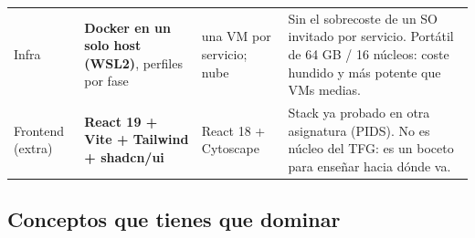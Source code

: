 \documentclass[11pt,a4paper]{article}
\begin{document}
\begin{center}
\begin{longtable}{>{\raggedright\arraybackslash}p{2.4cm} >{\raggedright\arraybackslash}p{3.1cm} >{\raggedright\arraybackslash}p{2.5cm} >{\raggedright\arraybackslash}p{6.2cm}}
Infra & \textbf{Docker en un solo host (WSL2)}, perfiles por fase & una VM por servicio; nube & Sin el sobrecoste de un SO invitado por servicio. Portátil de 64 GB / 16 núcleos: coste hundido y más potente que VMs medias. \\
Frontend (extra) & \textbf{React 19 + Vite + Tailwind + shadcn/ui} & React 18 + Cytoscape & Stack ya probado en otra asignatura (PIDS). No es núcleo del TFG: es un boceto para enseñar hacia dónde va. \\
\bottomrule
\end{longtable}
\end{center}

\subsection{Conceptos que tienes que dominar}
\end{document}
